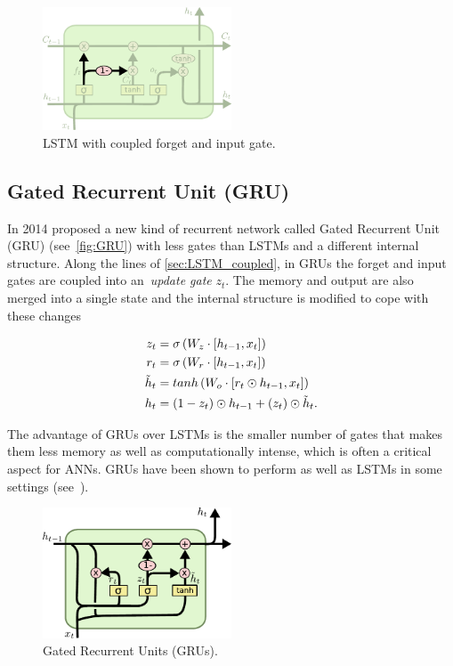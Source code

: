 \begin{figure}[t]
    \centering
    \includegraphics[width=0.5\textwidth]{pdf/LSTM_coupled.pdf}
    \caption{LSTM with coupled forget and input gate.\label{fig:LSTM_coupled}}
\end{figure}


\subsection{Gated Recurrent Unit (GRU)}\label{sec:GRU}

In 2014 \cite{Cho2014a} proposed a new kind of recurrent network called Gated
Recurrent Unit (GRU) (see~\autoref{fig:GRU}) with less gates than LSTMs and a
different internal structure. Along the lines of \autoref{sec:LSTM_coupled}, in
GRUs the forget and input gates are coupled into an~\emph{update gate} $z_t$.
The memory and output are also merged into a single state and the internal
structure is modified to cope with these changes

\begin{equation}\label{eq:GRU}
\begin{split}
    z_t &= \sigma \left( W_z \cdot \left[h_{t-1}, x_t\right]\right) \\
    r_t &= \sigma \left( W_r \cdot \left[h_{t-1}, x_t\right]\right) \\
    \tilde h_t &= tanh \left(W_o \cdot \left[r_t \odot h_{t-1}, x_t\right]
        \right) \\
    h_t &= (1-z_t) \odot h_{t-1} + (z_t) \odot \tilde h_t.
\end{split}
\end{equation}

The advantage of GRUs over LSTMs is the smaller number of gates that makes them
less memory as well as computationally intense, which is often a critical
aspect for ANNs. GRUs have been shown to perform as well as LSTMs in some
settings (see~\cite{Chung-et-al-NIPSDL2014-small}).

\begin{figure}[pt]
    \centering
    \includegraphics[width=0.5\textwidth]{pdf/GRU.pdf}
    \caption{Gated Recurrent Units (GRUs).\label{fig:GRU}}
\end{figure}
